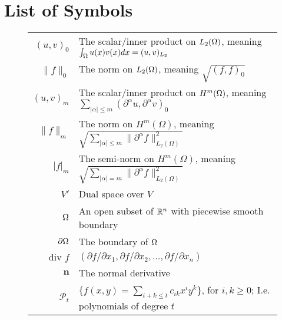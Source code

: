 \section*{List of Symbols}
\begin{center}
\begin{figure}[ht!]
\setlength{\extrarowheight}{10pt}
\begin{tabularx}{\textwidth}{rX}
$(u,v)_0$ &   The scalar/inner product on $L_2(\Omega)$, meaning $\int_\Omega u(x)v(x) dx =(u,v)_{L_2}$ \\
$\|f\|_0$ & The norm on $L_2(\Omega)$, meaning $\sqrt{(f,f)_0}$ \\
$(u,v)_m$ & The scalar/inner product on $H^m(\Omega)$, meaning $ \sum_{|\alpha|\leq m}(\partial ^{\alpha}u, \partial ^{\alpha} v)_0 $\\
$\|f\|_m$ & The norm on $H^m(\Omega)$, meaning $\sqrt{\sum_{|\alpha|\leq m}\|\partial ^\alpha f\|_{L_2(\Omega)}^2}$ \\
$|f|_m$ & The semi-norm on $H^m(\Omega)$, meaning $\sqrt{\sum_{|\alpha|= m}\|\partial ^\alpha f\|_{L_2(\Omega)}^2}$ \\
$V'$ & Dual space over $V$\\
$\Omega$ & An open subset of $\mathbb{R}^n$ with piecewise smooth boundary \\
$\partial\Omega$ & The boundary of $\Omega$\\
$\text{div }f$ & $(\partial f/\partial x_1,\partial f/\partial x_2,\ldots,\partial f/\partial x_n)$ \\
$\mathbf{n}$ & The normal derivative\\
$\mathcal{P}_t$ & $\{ f(x,y) = \sum_{i+k \leq t} c_{ik}x^i y^k \}$, for $i,k\geq 0$; I.e. polynomials of degree $t$ \\
\end{tabularx}
\end{figure}
\end{center}
\vfill
